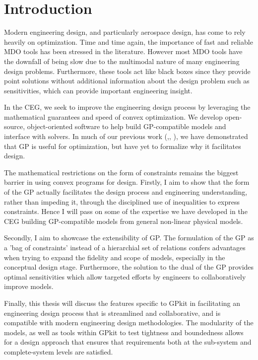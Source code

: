 \chapter{Introduction}
\label{ch1_intro}

Modern engineering design, and particularly aerospace design, has come to rely
heavily on optimization. Time and time again, the importance of fast and
reliable \gls{MDO} tools has been stressed in the literature. However most \gls{MDO} tools
have the downfall of being slow due to the multimodal nature of many
engineering design problems. Furthermore, these tools act like black boxes since
they provide point solutions without additional information about the design problem
such as sensitivities, which can provide important engineering insight.
	
In the \gls{CEG}, we seek to improve the engineering design process by
leveraging the mathematical guarantees and speed of convex optimization. We develop
open-source, object-oriented software to help build \gls{GP}-compatible models and
interface with solvers. In much of our previous work
(\cite{gp_ac_design},\cite{SP_ac_design}, \cite{sp_engine}), we have demonstrated that
\gls{GP} is useful for optimization, but have yet to formalize why it
facilitates design.
 
The mathematical restrictions on the form of constraints remains the biggest
barrier in using convex programs for design. Firstly, I
aim to show that the form of the GP actually facilitates the design process
and engineering understanding, rather than impeding it, through the disciplined use
of inequalities to express constraints. Hence I will
pass on some of the expertise we have developed in the \gls{CEG} building
\gls{GP}-compatible models from general non-linear physical models. 

Secondly, I aim to showcase the extensibility of \gls{GP}.
The formulation of the \gls{GP} as a 'bag of
constraints' instead of a hierarchial set of relations confers advantages 
when trying to expand the fidelity and scope of models, especially in the 
conceptual design stage. Furthermore, the solution to the dual of the \gls{GP}
provides optimal sensitivities which allow targeted efforts by engineers to
collaboratively improve models.

Finally, this thesis will discuss the features specific to GPkit in facilitating
an engineering design process that is streamlined and collaborative, and is
compatible with modern engineering design methodologies. The modularity of the 
models, as well as tools within GPkit to test tightness and boundedness
allows for a design approach that ensures that
requirements both at the sub-system and complete-system levels are satisfied.


